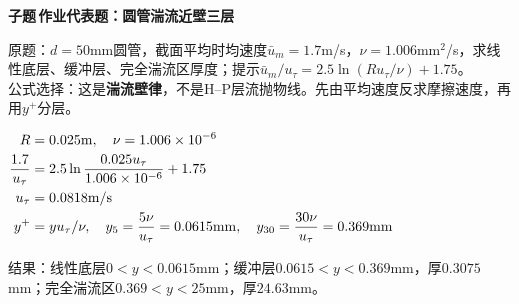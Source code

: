 \documentclass[a4paper]{article}
\newcommand{\tagsecbg}[3]{\vspace{0.10pt}\colorbox{subbg}{\begin{minipage}{\dimexpr\linewidth-2\fboxsep\relax}\fontsize{5.05}{5.24}\selectfont\bfseries\color{#1}\colorbox{#1}{\color{white}\fontsize{4.00}{4.14}\selectfont #2}\,\color{black}#3\end{minipage}}\par}
\newcommand{\subq}[1]{\tagsecbg{subc}{子题}{#1}}
\newcommand{\key}[1]{{\bfseries\color{h3}#1}}
\newcommand{\fmlb}[1]{\par\noindent\colorbox{bg}{\begin{minipage}{\dimexpr\linewidth-2\fboxsep\relax}\centering\fontsize{5.12}{5.42}\selectfont\ensuremath{\displaystyle #1}\end{minipage}}\par\vspace{0.10pt}}
\begin{document}
\begin{multicols*}{3}
\subq{作业代表题：圆管湍流近壁三层}
原题：$d=50$mm圆管，截面平均时均速度$\bar u_m=1.7$m/s，$\nu=1.006$mm$^2$/s，求线性底层、缓冲层、完全湍流区厚度；提示$\bar u_m/u_\tau=2.5\ln(Ru_\tau/\nu)+1.75$。\\
公式选择：这是\key{湍流壁律}，不是H--P层流抛物线。先由平均速度反求摩擦速度，再用$y^+$分层。
\fmlb{\begin{aligned}
R&=0.025{\rm m},\quad \nu=1.006\times10^{-6}\\
\frac{1.7}{u_\tau}&=2.5\ln\frac{0.025u_\tau}{1.006\times10^{-6}}+1.75\\
u_\tau&=0.0818{\rm m/s}\\
y^+&=yu_\tau/\nu,\quad
y_5=\frac{5\nu}{u_\tau}=0.0615{\rm mm},\quad
y_{30}=\frac{30\nu}{u_\tau}=0.369{\rm mm}
\end{aligned}}
结果：线性底层$0<y<0.0615$mm；缓冲层$0.0615<y<0.369$mm，厚$0.3075$mm；完全湍流区$0.369<y<25$mm，厚$24.63$mm。


\end{multicols*}
\end{document}
